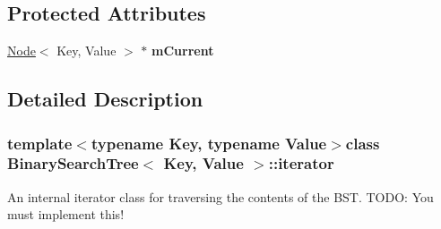 \subsection*{Protected Attributes}
\begin{DoxyCompactItemize}
\item 
\hypertarget{classBinarySearchTree_1_1iterator_a2f3115c3d4accda5f09629bf74391243}{\hyperlink{classNode}{Node}$<$ Key, Value $>$ $\ast$ {\bfseries m\-Current}}\label{classBinarySearchTree_1_1iterator_a2f3115c3d4accda5f09629bf74391243}

\end{DoxyCompactItemize}


\subsection{Detailed Description}
\subsubsection*{template$<$typename Key, typename Value$>$class Binary\-Search\-Tree$<$ Key, Value $>$\-::iterator}

An internal iterator class for traversing the contents of the B\-S\-T. T\-O\-D\-O\-: You must implement this! 


